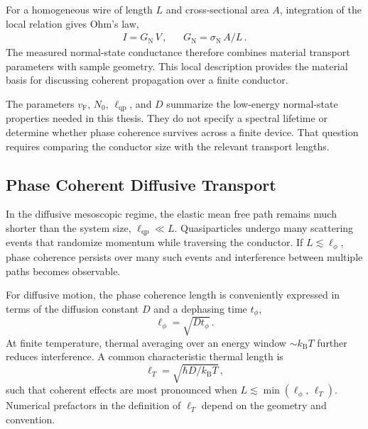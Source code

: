         For a homogeneous wire of length $L$ and cross-sectional area $A$, integration of the local relation gives Ohm's law,
        \begin{align}
            I = G_\mathrm{N}\,V\,, &&
            G_\mathrm{N} = \sigma_\mathrm{N}\,A/L\,.
        \end{align}
        The measured normal-state conductance therefore combines material transport parameters with sample geometry. This local description provides the material basis for discussing coherent propagation over a finite conductor. \cite{ohm_galvanische_1827}

        The parameters $v_\mathrm{F}$, $N_0$, $\ell_\mathrm{qp}$, and $D$ summarize the low-energy normal-state properties needed in this thesis. They do not specify a spectral lifetime or determine whether phase coherence survives across a finite device. That question requires comparing the conductor size with the relevant transport lengths.

    \subsection*{Phase Coherent Diffusive Transport}

        In the diffusive mesoscopic regime, the elastic mean free path remains much shorter than the system size, $\ell_\mathrm{qp} \ll L$. Quasiparticles undergo many scattering events that randomize momentum while traversing the conductor. If $L \lesssim \ell_\phi$, phase coherence persists over many such events and interference between multiple paths becomes observable.

        For diffusive motion, the phase coherence length is conveniently expressed in terms of the diffusion constant $D$ and a dephasing time $t_\phi$,
        \begin{equation}
            \ell_\phi = \sqrt{D t_\phi}\,.
        \end{equation}
        At finite temperature, thermal averaging over an energy window $\sim k_\mathrm{B}T$ further reduces interference. A common characteristic thermal length is
        \begin{equation}
            \ell_T = \sqrt{\hbar D / k_\mathrm{B}T}\,,
        \end{equation}
        such that coherent effects are most pronounced when $L \lesssim \min(\ell_\phi,\,\ell_T)$. Numerical prefactors in the definition of $\ell_T$ depend on the geometry and convention. \cite{bergmann_weak_1984,lee_disordered_1985}

